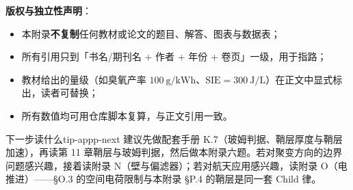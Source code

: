 \textbf{版权与独立性声明}：
\begin{itemize}[nosep,leftmargin=1.6em]
  \item 本附录\textbf{不复制}任何教材或论文的题目、解答、图表与数据表；
  \item 所有引用只到「书名/期刊名 + 作者 + 年份 + 卷页」一级，用于指路；
  \item 教材给出的量级（如臭氧产率 $100\ \mathrm{g/kWh}$、$\mathrm{SIE}=300\ \mathrm{J/L}$）在正文中显式标出，读者可替换；
  \item 所有数值均可用仓库脚本复算，与正文引用一致。
\end{itemize}

\begin{tip}{下一步读什么}{tip-appp-next}
建议先做配套手册 K.7（玻姆判据、鞘层厚度与鞘层加速），再读第 11 章鞘层与玻姆判据，然后做本附录六题。若对聚变方向的边界问题感兴趣，接着读附录 N（壁与偏滤器）；若对航天应用感兴趣，读附录 O（电推进）——§O.3 的空间电荷限制与本附录 §P.4 的鞘层是同一套 Child 律。
\end{tip}
\endgroup

